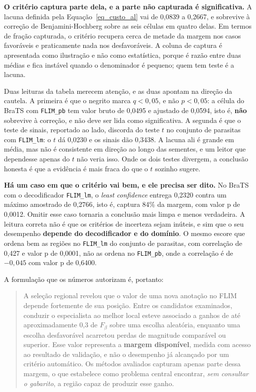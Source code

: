 \textbf{O critério captura parte dela, e a parte não capturada é significativa.} A lacuna definida pela Equação~\ref{eq_custo_al} vai de 0,0839 a 0,2667, e sobrevive à correção de Benjamini-Hochberg sobre as seis células em quatro delas. Em termos de fração capturada, o critério recupera cerca de metade da margem nos casos favoráveis e praticamente nada nos desfavoráveis. A coluna de captura é apresentada como ilustração e não como estatística, porque é razão entre duas médias e fica instável quando o denominador é pequeno; quem tem teste é a lacuna.

Duas leituras da tabela merecem atenção, e as duas apontam na direção da cautela. A primeira é que o negrito marca $q < 0{,}05$, e não $p < 0{,}05$: a célula do BraTS com \texttt{FLIM\_pb} tem valor bruto de 0,0495 e ajustado de 0,0594, isto é, \textbf{não} sobrevive à correção, e não deve ser lida como significativa. A segunda é que o teste de sinais, reportado ao lado, discorda do teste $t$ no conjunto de parasitas com \texttt{FLIM\_lm}: o $t$ dá 0,0230 e os sinais dão 0,3438. A lacuna ali é grande em média, mas não é consistente em direção ao longo das sementes, e um leitor que dependesse apenas do $t$ não veria isso. Onde os dois testes divergem, a conclusão honesta é que a evidência é mais fraca do que o $t$ sozinho sugere.

\textbf{Há um caso em que o critério vai bem, e ele precisa ser dito.} No BraTS com o decodificador \texttt{FLIM\_lm}, o \textit{least confidence} entrega 0,2320 contra um máximo amostrado de 0,2766, isto é, captura 84\% da margem, com valor p de 0,0012. Omitir esse caso tornaria a conclusão mais limpa e menos verdadeira. A leitura correta não é que os critérios de incerteza sejam inúteis, e sim que o seu desempenho \textbf{depende do decodificador e do domínio}. O mesmo escore que ordena bem as regiões no \texttt{FLIM\_lm} do conjunto de parasitas, com correlação de 0,427 e valor p de 0,0001, não as ordena no \texttt{FLIM\_pb}, onde a correlação é de $-0{,}045$ com valor p de 0,6400.

A formulação que os números autorizam é, portanto:

\begin{quote}
A seleção regional revelou que o valor de uma nova anotação no \ac{FLIM} depende fortemente de sua posição. Entre os candidatos examinados, conduzir o especialista ao melhor local esteve associado a ganhos de até aproximadamente 0,3 de $F_\beta$ sobre uma escolha aleatória, enquanto uma escolha desfavorável acarretou perdas de magnitude comparável ou superior. Esse valor representa a \textbf{margem disponível}, medida com acesso ao resultado de validação, e não o desempenho já alcançado por um critério automático. Os métodos avaliados capturam apenas parte dessa margem, o que estabelece como problema central encontrar, \emph{sem consultar o gabarito}, a região capaz de produzir esse ganho.
\end{quote}

